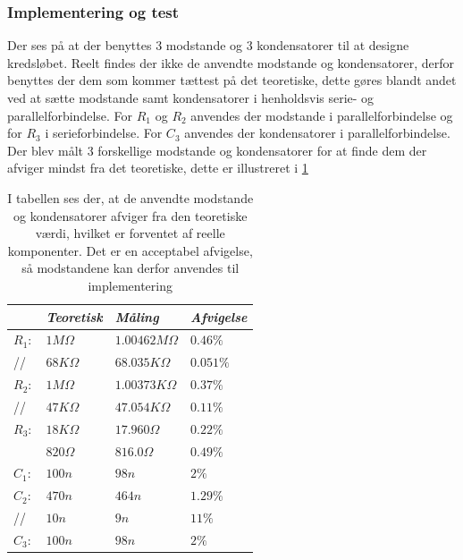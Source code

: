 \subsubsection{Implementering og test}
Der ses på  at der benyttes 3 modstande og 3 kondensatorer til at designe kredsløbet. Reelt findes der ikke de anvendte modstande og kondensatorer, derfor benyttes der dem som kommer tættest på det teoretiske, dette gøres  blandt andet ved at sætte modstande samt kondensatorer i henholdsvis serie- og parallelforbindelse. For $R_{1}$ og $R_{2}$ anvendes der modstande i parallelforbindelse og for $R_{3}$ i serieforbindelse. For $C_3$ anvendes der kondensatorer i parallelforbindelse. Der blev målt 3 forskellige modstande og kondensatorer for at finde dem der afviger mindst fra det teoretiske, dette er illustreret i \ref{Tab:Maalingfilter}

\begin{table}[H]
	\centering
	\begin{tabular}{|l|l|l|l|}
		\hline
						& \textit{Teoretisk}			& \textit{Måling} 	&  \textit{Afvigelse} \\ \hline
	 \textbf{$R_{1}:$} 	& $1M\Omega$ 				& $1.00462M\Omega$ 		& $0.46\%$  \\ \hline
				//		& $68K\Omega$ 				& $68.035K\Omega$ 		& $0.051\%$  \\ \hline
	 \textbf{$R_{2}:$} 	& $1M\Omega$ 				& $1.00373K\Omega$		& $0.37\%$	\\ \hline
	 			//		& $47K\Omega$ 				& $47.054K\Omega$		& $0.11\%$ 	\\ \hline
	 \textbf{$R_{3}:$} 	& $18K\Omega$				& $17.960\Omega$ 		& $0.22\%$ 	\\ \hline
	 					& $820\Omega$				& $816.0\Omega$			& $0.49\%$ 	\\ \hline
	 \textbf{$C_{1}:$} 	& $100n$ 					& $98n$ 					& $2\%$      \\ \hline
	 \textbf{$C_{2}:$} 	& $470n$						& $464n$					& $1.29\%$  		\\ \hline
	 			//		& $10n$						& $9n$					& $11\%$  		\\ \hline
	\textbf{$C_{3}:$}	& $100n$ 					& $98n$ 					& $2\%$      \\ \hline
	\end{tabular}
	\caption{I tabellen ses der, at de anvendte modstande og kondensatorer afviger fra den teoretiske værdi, hvilket er forventet af reelle komponenter. Det er en acceptabel afvigelse, så modstandene kan derfor anvendes til implementering}
	\label{Tab:Maalingfilter}
\end{table}

